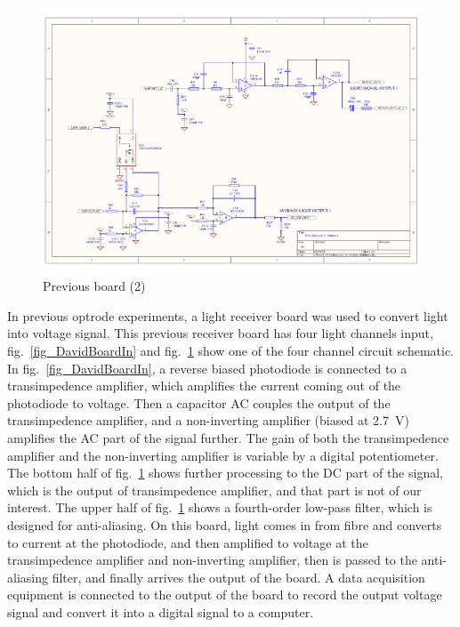 \begin{figure}[!ht]
\centering
\includegraphics[width=0.9\linewidth]{4-ANC_Sys/FibreReceiver_3c_Output1.pdf}
\caption{Previous board (2)}
\label{fig_DavidBoardOut}
\end{figure}

In previous optrode experiments, a light receiver board was used to convert light into voltage signal.  This previous receiver board has four light channels input, fig.~\ref{fig_DavidBoardIn} and fig.~\ref{fig_DavidBoardOut} show one of the four channel circuit schematic.  In fig.~\ref{fig_DavidBoardIn}, a reverse biased photodiode is connected to a transimpedence amplifier, which amplifies the current coming out of the photodiode to voltage.  Then a capacitor AC couples the output of the transimpedence amplifier, and a non-inverting amplifier (biased at \qty{2.7}{V}) amplifies the AC part of the signal further.  The gain of both the transimpedence amplifier and the non-inverting amplifier is variable by a digital potentiometer.  The bottom half of fig.~\ref{fig_DavidBoardOut} shows further processing to the DC part of the signal, which is the output of transimpedence amplifier, and that part is not of our interest.  The upper half of fig.~\ref{fig_DavidBoardOut} shows a fourth-order low-pass filter, which is designed for anti-aliasing.  On this board, light comes in from fibre and converts to current at the photodiode, and then amplified to voltage at the transimpedence amplifier and non-inverting amplifier, then is passed to the anti-aliasing filter, and finally arrives the output of the board.  A data acquisition equipment is connected to the output of the board to record the output voltage signal and convert it into a digital signal to a computer.

